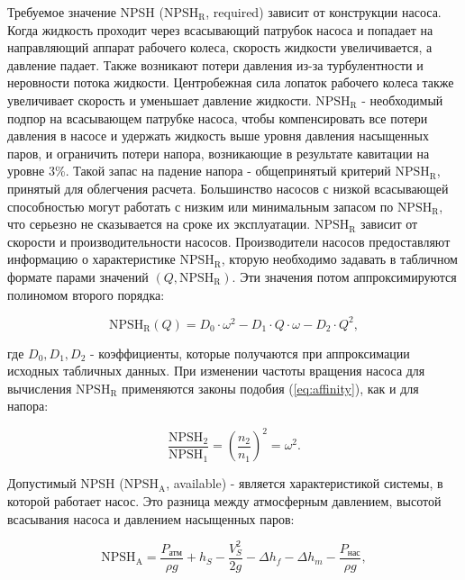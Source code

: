 \documentclass[a4paper, 12pt]{article}
\begin{document}
Требуемое значение NPSH ($\text{NPSH}{_\text{R}}$, required) зависит от конструкции насоса. Когда жидкость проходит через всасывающий патрубок насоса и попадает на направляющий аппарат рабочего колеса, скорость жидкости увеличивается, а давление падает. Также возникают потери давления из-за турбулентности и неровности потока жидкости. Центробежная сила лопаток рабочего колеса также увеличивает скорость и уменьшает давление жидкости. $\text{NPSH}{_\text{R}}$ - необходимый подпор на всасывающем патрубке насоса, чтобы компенсировать все потери давления в насосе и удержать жидкость выше уровня давления насыщенных паров, и ограничить потери напора, возникающие в результате кавитации на уровне 3\%. Такой запас на падение напора - общепринятый критерий $\text{NPSH}{_\text{R}}$, принятый для облегчения расчета. Большинство насосов с низкой всасывающей способностью могут работать с низким или минимальным запасом по $\text{NPSH}{_\text{R}}$, что серьезно не сказывается на сроке их эксплуатации. $\text{NPSH}{_\text{R}}$ зависит от скорости и производительности насосов. Производители насосов предоставляют информацию о характеристике $\text{NPSH}{_\text{R}}$, кторую необходимо задавать в табличном формате парами значений \((Q, \text{NPSH}{_\text{R}})\). Эти значения потом аппроксимируются полиномом второго порядка:

\begin{equation}\label{eq:NPSH_curve}
	\text{NPSH}{_\text{R}}(Q) = D_0 \cdot \omega^2 - D_1 \cdot Q \cdot \omega - D_2 \cdot Q^2,
\end{equation}

\noindent где $D_0, D_1, D_2$ - коэффициенты, которые получаются при аппроксимации исходных табличных данных. При изменении частоты вращения насоса для вычисления $\text{NPSH}{_\text{R}}$ применяются законы подобия (\ref{eq:affinity}), как и для напора:

\begin{equation}\label{eq:affinity1}
	\frac{\text{NPSH}_2}{\text{NPSH}_1} = \left(\frac{n_2}{n_1}\right)^2 = \omega^2.
\end{equation}

Допустимый NPSH ($\text{NPSH}{_\text{A}}$, available) - является характеристикой системы, в которой работает насос. Это разница между атмосферным давлением, высотой всасывания насоса и давлением насыщенных паров:

\begin{equation}
	\text{NPSH}{_\text{A}} = \frac{P_{\text{атм}}}{\rho g} + h_S - \frac{V_S^2}{2g} - \Delta h_f - \Delta h_m - \frac{P_{\text{нас}}}{\rho g} ,
\end{equation}
\end{document}
